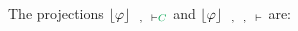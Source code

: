 \begin{example}
\noindent
The projections $\projection{\varphi}{\hC{B}, \hD{A} \seq \hE{C}}$ and $\projection{\varphi}{\hC{B}, \hD{A}, \hF{C} \seq}$ are:
\begin{multicols}{2}{
\begin{scriptsize}
\begin{prooftree}
				 
			 
							 
\end{prooftree}
\end{scriptsize}

\begin{scriptsize}
\begin{prooftree}
					 
				 
									 
									 
\end{prooftree}
\end{scriptsize}
}
\end{multicols}
\hfill\QED
\end{example}

